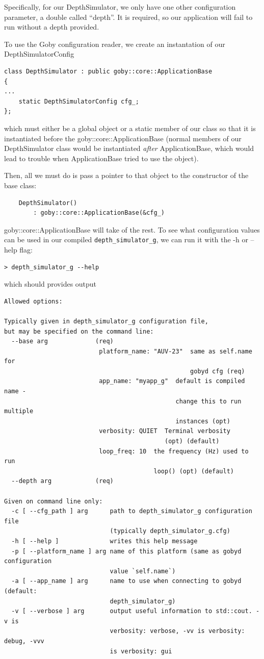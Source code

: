 \documentclass[11pt, letterpaper]{article}
\begin{document}
Specifically, for our DepthSimulator, we only have one other configuration parameter, a double called ``depth''. It is required, so our application will fail to run without a depth provided.

To use the Goby configuration reader, we create an instantation of our DepthSimulatorConfig
\begin{verbatim}
class DepthSimulator : public goby::core::ApplicationBase
{ 
...
    static DepthSimulatorConfig cfg_;
};
\end{verbatim}
which must either be a global object or a static member of our class so that it is instantiated before the goby::core::ApplicationBase (normal members of our DepthSimulator class would be instantiated \textit{after} ApplicationBase, which would lead to trouble when ApplicationBase tried to use the object).

Then, all we must do is pass a pointer to that object to the constructor of the base class:
\begin{verbatim}
    DepthSimulator()
        : goby::core::ApplicationBase(&cfg_)
\end{verbatim}
goby::core::ApplicationBase will take of the rest. To see what configuration values can be used in our compiled \texttt{depth\_simulator\_g}, we can run it with the -h or --help flag:
\begin{verbatim}
> depth_simulator_g --help
\end{verbatim}

which should provides output 
\begin{small}\begin{verbatim}
Allowed options:

Typically given in depth_simulator_g configuration file,
but may be specified on the command line:
  --base arg             (req)
                          platform_name: "AUV-23"  same as self.name for 
                                                   gobyd cfg (req)
                          app_name: "myapp_g"  default is compiled name - 
                                               change this to run multiple 
                                               instances (opt)
                          verbosity: QUIET  Terminal verbosity 
                                            (opt) (default)
                          loop_freq: 10  the frequency (Hz) used to run 
                                         loop() (opt) (default)
  --depth arg            (req)

Given on command line only:
  -c [ --cfg_path ] arg      path to depth_simulator_g configuration file 
                             (typically depth_simulator_g.cfg)
  -h [ --help ]              writes this help message
  -p [ --platform_name ] arg name of this platform (same as gobyd configuration
                             value `self.name`)
  -a [ --app_name ] arg      name to use when connecting to gobyd (default: 
                             depth_simulator_g)
  -v [ --verbose ] arg       output useful information to std::cout. -v is 
                             verbosity: verbose, -vv is verbosity: debug, -vvv 
                             is verbosity: gui
\end{verbatim}\end{small}
\end{document}
